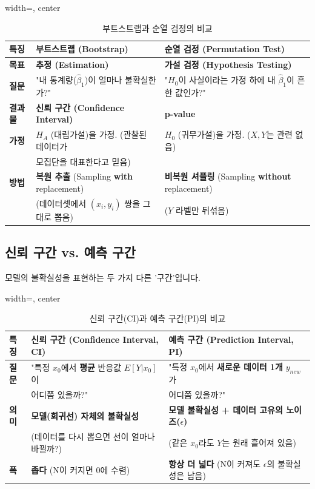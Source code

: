 \documentclass[11pt,a4paper]{book}
\theoremstyle{definition}
\begin{document}
\begin{table}[h!]
\begin{adjustbox}{width=\textwidth, center}
\begin{tabular}{lll}
\toprule
\textbf{특징} & \textbf{부트스트랩 (Bootstrap)} & \textbf{순열 검정 (Permutation Test)} \\
\midrule
\textbf{목표} & \textbf{추정 (Estimation)} & \textbf{가설 검정 (Hypothesis Testing)} \\
\textbf{질문} & "내 통계량($\hat{\beta}_1$)이 얼마나 불확실한가?" & "$H_0$이 사실이라는 가정 하에 내 $\hat{\beta}_1$이 흔한 값인가?" \\
\textbf{결과물} & \textbf{신뢰 구간 (Confidence Interval)} & \textbf{p-value} \\
\textbf{가정} & $H_A$ (대립가설)을 가정. (관찰된 데이터가 & $H_0$ (귀무가설)을 가정. ($X, Y$는 관련 없음) \\
 & 모집단을 대표한다고 믿음) & \\
\textbf{방법} & \textbf{복원 추출} (Sampling \textbf{with} replacement) & \textbf{비복원 셔플링} (Sampling \textbf{without} replacement) \\
 & (데이터셋에서 $(x_i, y_i)$ 쌍을 그대로 뽑음) & ($Y$ 라벨만 뒤섞음) \\
\bottomrule
\end{tabular}
\end{adjustbox}
\caption{부트스트랩과 순열 검정의 비교}
\label{tab:boot_vs_perm}
\end{table}

\subsection{신뢰 구간 vs. 예측 구간}
모델의 불확실성을 표현하는 두 가지 다른 '구간'입니다.

\begin{table}[h!]
\begin{adjustbox}{width=\textwidth, center}
\begin{tabular}{lll}
\toprule
\textbf{특징} & \textbf{신뢰 구간 (Confidence Interval, CI)} & \textbf{예측 구간 (Prediction Interval, PI)} \\
\midrule
\textbf{질문} & "특정 $x_0$에서 \textbf{평균} 반응값 $E[Y|x_0]$이 & "특정 $x_0$에서 \textbf{새로운 데이터 1개} $y_{new}$가 \\
 & 어디쯤 있을까?" & 어디쯤 있을까?" \\
\textbf{의미} & \textbf{모델(회귀선) 자체의 불확실성} & \textbf{모델 불확실성 + 데이터 고유의 노이즈($\epsilon$)} \\
 & (데이터를 다시 뽑으면 선이 얼마나 바뀔까?) & (같은 $x_0$라도 $Y$는 원래 흩어져 있음) \\
\textbf{폭} & \textbf{좁다} (N이 커지면 0에 수렴) & \textbf{항상 더 넓다} (N이 커져도 $\epsilon$의 불확실성은 남음) \\
\bottomrule
\end{tabular}
\end{adjustbox}
\caption{신뢰 구간(CI)과 예측 구간(PI)의 비교}
\label{tab:ci_vs_pi}
\end{table}
\end{document}
